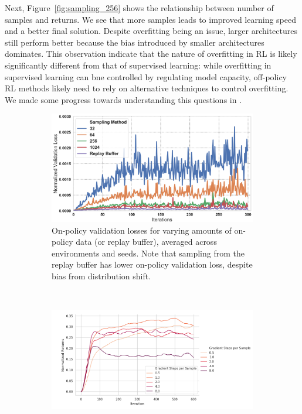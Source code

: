 Next, Figure~\ref{fig:sampling_256} shows the relationship between number of samples and returns. We see that more samples leads to improved learning speed and a better final solution. Despite overfitting being an issue, larger architectures still perform better because the bias introduced by smaller architectures dominates. This observation indicate that the nature of overfitting in RL is likely significantly different from that of supervised learning: while overfitting in supervised learning can bne controlled by regulating model capacity, off-policy RL methods likely need to rely on alternative techniques to control overfitting. We made some progress towards understanding this questions in \citet{li2023efficient}.   

\begin{figure}[ttt!]
\begin{subfigure}{0.31\linewidth}
\includegraphics[width=0.97\linewidth]{chapters/diagnosing_q/images/overfitting.pdf}
\caption{\label{fig:sampling_validation_loss} On-policy validation losses for varying amounts of on-policy data (or replay buffer), averaged across environments and seeds. Note that sampling from the replay buffer has lower on-policy validation loss, despite bias from distribution shift.}
\end{subfigure}
~\vline~
\begin{subfigure}{0.31\linewidth}
\includegraphics[trim={0 0 7.0cm 0},clip,width=0.97\linewidth]{chapters/diagnosing_q/images/grad_steps_fqi}

\end{subfigure}
\end{figure}
